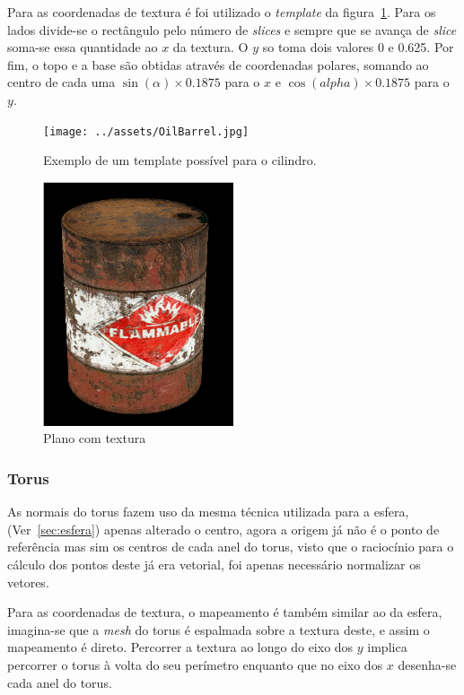 \documentclass[a4paper]{article}
\begin{document}
Para as coordenadas de textura é foi utilizado o \textit{template} da
figura~\ref{fig:cilindro}. Para os lados divide-se o rectângulo pelo número de
\textit{slices} e sempre que se avança de \textit{slice} soma-se essa quantidade
ao $x$ da textura. O $y$ so toma dois valores 0 e 0.625. Por fim, o topo e a
base são obtidas através de coordenadas polares, somando ao centro de cada uma
$\sin(\alpha) \times 0.1875$ para o $x$ e $\cos(alpha) \times 0.1875$ para o $y$.

\begin{figure}[H]
    \centering
    \texttt{[image: ../assets/OilBarrel.jpg]}
    \caption{Exemplo de um template possível para o
    cilindro.}\label{fig:cilindro}
\end{figure}

\begin{figure}[H]
    \centering
    \includegraphics[width=0.5\textwidth]{cylinder.png}
    \caption{Plano com textura}
\end{figure}

\subsubsection{Torus}
As normais do torus fazem uso da mesma técnica utilizada para a esfera,
(Ver~\ref{sec:esfera}) apenas alterado o centro, agora a origem já não é o
ponto de referência mas sim os centros de cada anel do torus, visto que o
raciocínio para o cálculo dos pontos deste já era vetorial, foi apenas
necessário normalizar os vetores.

Para as coordenadas de textura, o mapeamento é também similar ao da esfera,
imagina-se que a \textit{mesh} do torus é espalmada sobre a textura deste, e
assim o mapeamento é direto. Percorrer a textura ao longo do eixo dos $y$
implica percorrer o torus à volta do seu perímetro enquanto que no eixo dos $x$
desenha-se cada anel do torus.
\end{document}
